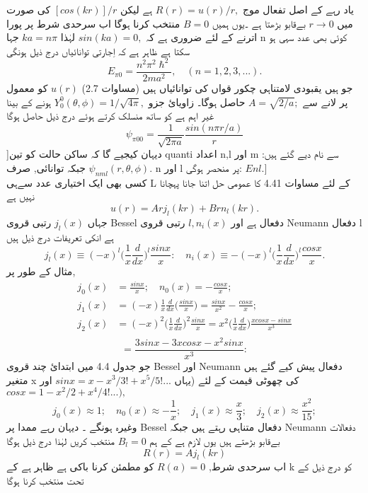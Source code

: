 \documentclass{book}
\begin{document}
یاد رہے کے اصل تفعال موج
\(R(r)=u(r)/r,\)
ہے لیکن
\([cos(kr)]/r\)
کی صورت میں
\(r\rightarrow{0}\)
بےقابو بڑھتا ہے ۔یوں ہمیں
\(B=0\)
منتخب کرنا ہوگا اب سرحدی شرط پر پورا اترنے کے لئے ضروری ہے کہ
\(sin(ka)=0,\)
لہٰذا
\(ka=n\pi\)
جہا n کوئی بھی عدد سہی ہو سکتا ہے ظاہر ہے کہ اِجارتی توانائیاں درج ذیل ہونگی\\ 
\[E_{\pi0}=\frac{n^{2}\pi^{2}\hslash^{2}}{2ma^{2}},\quad(n=1,2,3,...).\]
جو ہیں یقبودی لامتناہی چکور قواں کی توانائیاں ہیں (مساوات 2.7)
\(u(r)\)
کو معمول پر لانے سے
\(A=\sqrt{2/a};\)
حاصل ہوگا۔ زاویائ جزو
\(Y_{0}^{0}(\theta,\phi)=1/\sqrt{4\pi},\)
ہونے کے بینا غیر اہم ہے کو ساتھ منسلک کرتے ہوئے درج ذیل حاصل ہوگا\\
\[\psi_{\pi00}=\frac{1}{\sqrt{2\pi{a}}}\frac{sin(n\pi{r/a})}{r}\]
]دیہان کیجیے گا کہ ساکن حالت کو تین quanti اعداد n,l اور m سے نام دیے گئے ہیں:
\(\psi_{nml}(r,\theta,\phi).\)
جبکہ توانائی, صرف n اور l پر منحصر ہوگی:
\(E{nl}.]\)\\
کسی بھی ایک اختیاری عدد سےہی L کے لئے مساوات 4.41 کا عمومی حل اتنا جانا پہچانا نہیں ہے 
\[u(r)=Arj_{l}(kr)+Brn_{l}(kr).\]
جہاں
\(j_{l}(x)\)
رتبی قروی Bessel دفعال ہے اور 
\(l,n_{i}(x)\)
رتبی قروی Neumann دفعال l ہے انکی تعریفات درج ذیل ہیں 
\[j_{l}(x)\equiv(-x)^{l}\big(\frac{1}{x}\frac{d}{dx}\big)^{l}\frac{sinx}{x}:\quad{n_{i}(x)\equiv-(-x)^{l}}\big(\frac{1}{x}\frac{d}{dx}\big)^{l}\frac{cosx}{x}.\]
مثال کے طور پر,\\
\begin{align*}
j_{0}(x)&=\frac{sinx}{x};\quad{n_{0}(x)=-\frac{cosx}{x};}\\
j_1(x)&=(-x)\frac{1}{x}\frac{d}{dx}\big(\frac{sinx}{x}\big)=\frac{sinx}{x^{2}}-\frac{cosx}{x};\\
j_{2}(x)&=(-x)^{2}\big(\frac{1}{x}\frac{d}{dx}\big)^{2}\frac{sinx}{x}=x^{2}\big(\frac{1}{x}\frac{d}{dx}\big)\frac{xcosx-sinx}{x^{3}}\\
\end{align*}
\[=\frac{3sinx-3xcosx-x^{2}sinx}{x^{3}}:\]
جو جدول 4.4 میں ابتدائ چند قروی Bessel اور Neumann دفعال پیش کیے گئے ہیں متغیر x کی چھوٹی قیمت کے لئے (یہاں
\(sinx=x-x^{3}/3!+x^{5}/5!...\)
اور
\(cosx=1-x^{2}/2+x^{4}/4!...),\)\\
\[j_{0}(x)\approx1;\quad{n_{0}(x)\approx-\frac{1}{x}};\quad{j_{1}(x)\approx\frac{x}{3}};\quad{j_{2}(x)\approx\frac{x^{2}}{15}};\]
وغیرہ ہونگے ۔ دیہان رہے ممدا پر Bessel دفعال متناہی رہتے ہیں جبکہ Neumann دفعالات بےقابو بڑھتے ہیں یوں لازم ہے کے ہم
\(B_{l}=0\)
منتخب کریں لہٰذا درج ذیل ہوگا \\
\[R(r)=Aj_{l}(kr)\]
اب سرحدی شرط,
\(R(a)=0\)
کو مطمئن کرنا باکی ہے ظاہر ہے کے k کو درج ذیل کے تحت منتخب کرنا ہوگا\\
\end{document}
